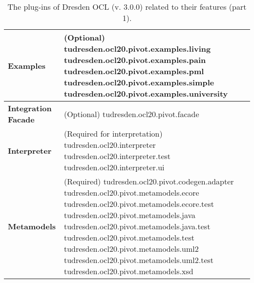 \begin{table}[p]
\begin{tabular}{|p{4cm}|p{10cm}|}
    \textbf{Examples} &
    (Optional)\newline
    tudresden.ocl20.pivot.examples.living\newline
    tudresden.ocl20.pivot.examples.pain\newline
    tudresden.ocl20.pivot.examples.pml\newline
    tudresden.ocl20.pivot.examples.simple\newline
    tudresden.ocl20.pivot.examples.university\\
    \hline

    \textbf{Integration Facade} &
    (Optional)\newline
    tudresden.ocl20.pivot.facade\\
    \hline

    \textbf{Interpreter} &
    (Required for interpretation)\newline
    tudresden.ocl20.interpreter\newline
    tudresden.ocl20.interpreter.test\newline
    tudresden.ocl20.interpreter.ui\\
    \hline
 
    \textbf{Metamodels} &
    (Required)\newline
    tudresden.ocl20.pivot.codegen.adapter\newline
    tudresden.ocl20.pivot.metamodels.ecore\newline
    tudresden.ocl20.pivot.metamodels.ecore.test\newline
    tudresden.ocl20.pivot.metamodels.java\newline
    tudresden.ocl20.pivot.metamodels.java.test\newline
    tudresden.ocl20.pivot.metamodels.test\newline
    tudresden.ocl20.pivot.metamodels.uml2\newline
    tudresden.ocl20.pivot.metamodels.uml2.test\newline
    tudresden.ocl20.pivot.metamodels.xsd\\
    \hline
 
\end{tabular}
\caption{The plug-ins of Dresden OCL (v. 3.0.0) related to their features (part 1).}
\label{tab:plugins}
\end{table}

